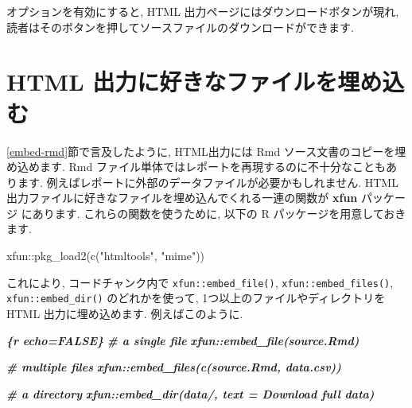\documentclass[
  11pt,
  lualatex,ja=standard,jafont=noto]{bxjsreport}
\newenvironment{Shaded}{\begin{snugshade}}{\end{snugshade}}
\newcommand{\FunctionTok}[1]{\textcolor[rgb]{0.00,0.00,0.00}{#1}}
\newcommand{\InformationTok}[1]{\textcolor[rgb]{0.56,0.35,0.01}{\textbf{\textit{#1}}}}
\newcommand{\NormalTok}[1]{#1}
\newcommand{\SpecialCharTok}[1]{\textcolor[rgb]{0.00,0.00,0.00}{#1}}
\newcommand{\StringTok}[1]{\textcolor[rgb]{0.31,0.60,0.02}{#1}}
\begin{document}
オプションを有効にすると, HTML 出力ページにはダウンロードボタンが現れ, 読者はそのボタンを押してソースファイルのダウンロードができます.

\hypertarget{embed-file}{%
\section{HTML 出力に好きなファイルを埋め込む}\label{embed-file}}

\ref{embed-rmd}節で言及したように, HTML出力には Rmd ソース文書のコピーを埋め込めます. Rmd ファイル単体ではレポートを再現するのに不十分なこともあります. 例えばレポートに外部のデータファイルが必要かもしれません. HTML 出力ファイルに好きなファイルを埋め込んでくれる一連の関数が \textbf{xfun} パッケージ \autocite{R-xfun} にあります. これらの関数を使うために, 以下の R パッケージを用意しておきます.

\begin{Shaded}
\begin{Highlighting}[numbers=left,,]
\NormalTok{xfun}\SpecialCharTok{::}\FunctionTok{pkg\_load2}\NormalTok{(}\FunctionTok{c}\NormalTok{(}\StringTok{"htmltools"}\NormalTok{, }\StringTok{"mime"}\NormalTok{))}
\end{Highlighting}
\end{Shaded}

これにより, コードチャンク内で \texttt{xfun::embed\_file()}, \texttt{xfun::embed\_files()}, \texttt{xfun::embed\_dir()} のどれかを使って, 1つ以上のファイルやディレクトリを HTML 出力に埋め込めます. 例えばこのように.

\begin{Shaded}
\begin{Highlighting}[]
\InformationTok{\textasciigrave{}\textasciigrave{}\textasciigrave{}\{r echo=FALSE\}}
\InformationTok{\# a single file}
\InformationTok{xfun::embed\_file(\textquotesingle{}source.Rmd\textquotesingle{})}

\InformationTok{\# multiple files}
\InformationTok{xfun::embed\_files(c(\textquotesingle{}source.Rmd\textquotesingle{}, \textquotesingle{}data.csv\textquotesingle{}))}

\InformationTok{\# a directory}
\InformationTok{xfun::embed\_dir(\textquotesingle{}data/\textquotesingle{}, text = \textquotesingle{}Download full data\textquotesingle{})}
\InformationTok{\textasciigrave{}\textasciigrave{}\textasciigrave{}}
\end{Highlighting}
\end{Shaded}
\end{document}
